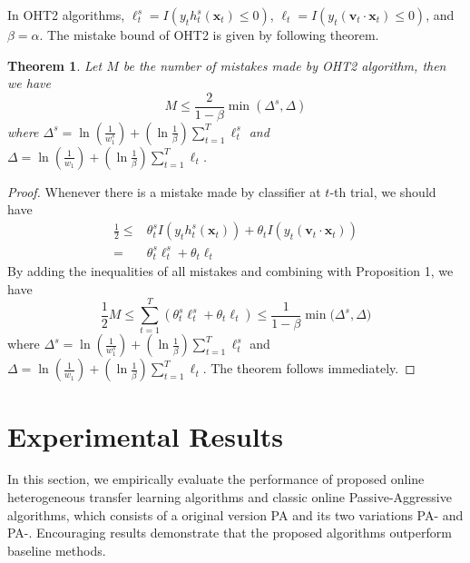 \documentclass[letterpaper]{article}
\newtheorem{thm}{Theorem}
\theoremstyle{remark}
\theoremstyle{definition}
\begin{document}
In OHT2 algorithms, $\ell_{t}^{s} = I(y_t h_{t}^{s}(\mathbf{x}_t) \leq 0)$, $\ell_t = I(y_t (\mathbf{v}_t \cdot \mathbf{x}_t) \leq 0)$, and $\beta = \alpha$.
The mistake bound of OHT2 is given by following theorem.

\begin{thm}
Let $M$ be the number of mistakes made by OHT2 algorithm, then we have 
$$ M \leq \frac{2}{1-\beta} \min (\varDelta^s, \varDelta) $$
where
$ \varDelta^s = \ln(\frac{1}{w_{1}^{s}}) + (\ln \frac{1}{\beta}) \sum\limits_{t=1}^{T} \ell_{t}^{s} $ and $ \varDelta = \ln(\frac{1}{w_{1}}) + (\ln \frac{1}{\beta}) \sum\limits_{t=1}^{T} \ell_{t} $.
\end{thm}

\begin{proof}
Whenever there is a mistake made by classifier at $t$-th trial, we should have
\begin{equation*}
\begin{split}
\frac{1}{2} \leq
  & \theta_{t}^{s} I(y_t h_{t}^{s}(\mathbf{x}_t)) + \theta_t I(y_t (\mathbf{v}_t \cdot \mathbf{x}_t)) \\
= & \theta_{t}^{s} \ell_{t}^{s} + \theta_t \ell_t
\end{split}
\end{equation*}
By adding the inequalities of all mistakes and combining with Proposition 1, we have
$$ \frac{1}{2}M \leq \sum\limits_{t=1}^{T} ( \theta_{t}^{s} \ell_{t}^{s} + \theta_t \ell_t ) \leq \frac{1}{1-\beta} \min \big( \varDelta^s, \varDelta \big) $$
where
$ \varDelta^s = \ln(\frac{1}{w_{1}^{s}}) + (\ln \frac{1}{\beta}) \sum\limits_{t=1}^{T} \ell_{t}^{s} $ and $ \varDelta = \ln(\frac{1}{w_{1}}) + (\ln \frac{1}{\beta}) \sum\limits_{t=1}^{T} \ell_{t} $.
The theorem follows immediately.
\end{proof}


\section{Experimental Results}

In this section, we empirically evaluate the performance of proposed online heterogeneous transfer learning algorithms and classic online Passive-Aggressive algorithms, which consists of a original version PA and its two variations PA-\uppercase\expandafter{} and PA-\uppercase\expandafter{}.
Encouraging results demonstrate that the proposed algorithms outperform baseline methods.
\end{document}
